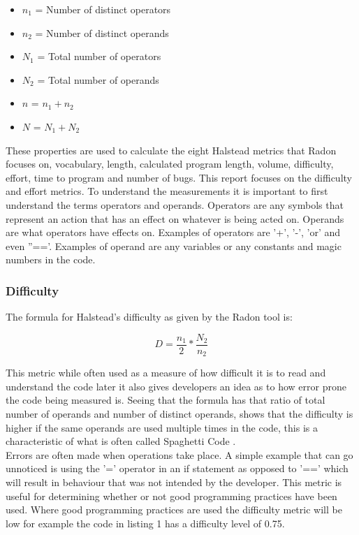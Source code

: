 \documentclass[10.5pt,journal, a4paper]{IEEEtran}
\begin{document}
\begin{itemize}
\item $n_{1}$ = Number of distinct operators
\item $n_{2}$ = Number of distinct operands
\item $N_{1}$ = Total number of operators
\item $N_{2}$ = Total number of operands
\item $n$ = $n_{1} + n_{2}$
\item $N$ = $N_{1} + N_{2}$
\end{itemize}

\noindent
These properties are used to calculate the eight Halstead metrics that Radon focuses on, vocabulary, length, calculated program length, volume, difficulty, effort, time to program and number of bugs. This report focuses on the difficulty and effort metrics. To understand the measurements it is important to first understand the terms operators and operands. Operators are any symbols that represent an action that has an effect on whatever is being acted on. Operands are what operators have effects on. Examples of operators are '+', '-', 'or' and even ''=='. Examples of operand are any variables or any constants and magic numbers in the code. 

\subsubsection{Difficulty}
\noindent
The formula for Halstead's difficulty as given by the Radon tool is:

\begin{equation}
 D  = \frac{n_{1}}{2}*\frac{N_{2}}{n_{2}}
\end{equation}

This metric while often used as a measure of how difficult it is to read and understand the code later it also gives developers an idea as to how error prone the code being measured is. Seeing that the formula has that ratio of total number of operands and number of distinct operands, shows that the difficulty is higher if the same operands are used multiple times in the code, this is a characteristic of what is often called Spaghetti Code \cite{SPAG}. \\

\noindent
Errors are often made when operations take place. A simple example that can go unnoticed is using the '=' operator in an if statement as opposed to '==' which will result in behaviour that was not intended by the developer. This metric is useful for determining whether or not good programming practices have been used. Where good programming practices are used the difficulty metric will be low for example the code in listing 1 has a difficulty level of 0.75. 
\end{document}
